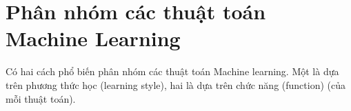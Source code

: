 \chapter{Phân nhóm các thuật toán Machine Learning}

Có hai cách phổ biến phân nhóm các thuật toán Machine learning. Một là dựa trên phương thức học (learning style), hai là dựa trên chức năng (function) (của mỗi thuật toán).
